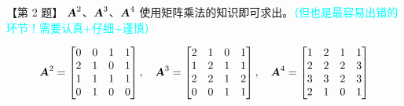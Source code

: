\documentclass[UTF8]{ctexart}
\newcommand\A{\text{\slshape\bfseries A}}
\begin{document}
【第 2 题】 $\A^2$、$\A^3$、$\A^4$ 使用矩阵乘法的知识即可求出。\textcolor{cyan}{（但也是最容易出错的环节！需要认真+仔细+谨慎）}

\newpage
{}
\BgThispage
\begin{equation}
    \A^2 = \begin{bmatrix} 0&0&1&1 \\ 2&1&0&1 \\ 1&1&1&1 \\ 0&1&0&0 \end{bmatrix},\quad
    \A^3 = \begin{bmatrix} 2&1&0&1 \\ 1&2&1&1 \\ 2&2&1&2 \\ 0&0&1&1 \end{bmatrix},\quad
    \A^4 = \begin{bmatrix} 1&2&1&1 \\ 2&2&2&3 \\ 3&3&2&3 \\ 2&1&0&1 \end{bmatrix}
\end{equation}
\end{document}
